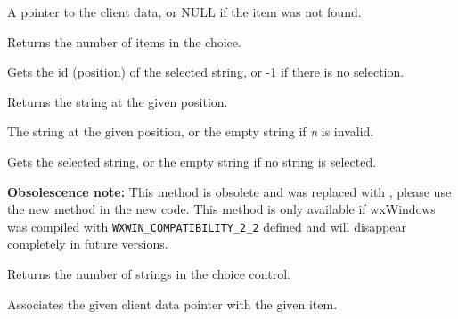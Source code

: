 
A pointer to the client data, or NULL if the item was not found.

\label{wxchoicegetcount}


Returns the number of items in the choice.

\label{wxchoicegetselection}


Gets the id (position) of the selected string, or -1 if there is no selection.

\label{wxchoicegetstring}


Returns the string at the given position.




The string at the given position, or the empty string if {\it n} is invalid.

\label{wxchoicegetstringselection}


Gets the selected string, or the empty string if no string is selected.

\label{wxchoicenumber}


{\bf Obsolescence note:} This method is obsolete and was replaced with 
, please use the new method in the new
code. This method is only available if wxWindows was compiled with 
{\tt WXWIN\_COMPATIBILITY\_2\_2} defined and will disappear completely in
future versions.

Returns the number of strings in the choice control.

\label{wxchoicesetclientdata}


Associates the given client data pointer with the given item.


